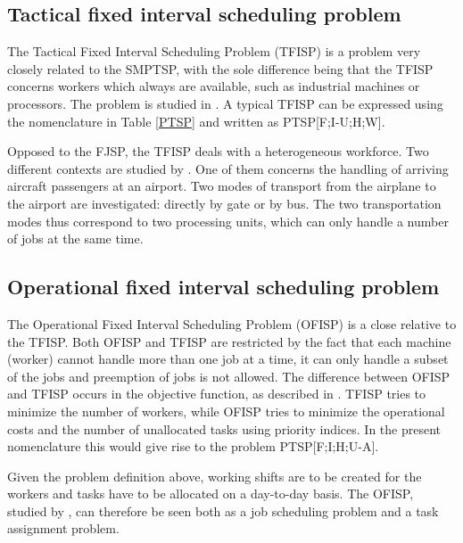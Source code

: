 \subsection{Tactical fixed interval scheduling problem} \label{TFISP}
The Tactical Fixed Interval Scheduling Problem (TFISP) is a problem very closely related to the SMPTSP, with the sole difference being that the TFISP concerns workers which always are available, such as industrial machines or processors. The problem is studied in \citet{kroon_1995}. A typical TFISP can be expressed using the nomenclature in Table \ref{PTSP} and written as PTSP[F;I-U;H;W].

Opposed to the FJSP, the TFISP deals with a heterogeneous workforce. Two different contexts are studied by \citet{kroon_1995}. One of them concerns the handling of arriving aircraft passengers at an airport. Two modes of transport from the airplane to the airport are investigated: directly by gate or by bus. The two transportation modes thus correspond to two processing units, which can only handle a number of jobs at the same time.

\subsection{Operational fixed interval scheduling problem}
The Operational Fixed Interval Scheduling Problem (OFISP) is a close relative to the TFISP. Both OFISP and TFISP are restricted by the fact that each machine (worker) cannot handle more than one job at a time, it can only handle a subset of the jobs and preemption of jobs is not allowed. The difference between OFISP and TFISP occurs in the objective function, as described in \citet{kroon_1995}. TFISP tries to minimize the number of workers, while OFISP tries to minimize the operational costs and the number of unallocated tasks using priority indices. In the present nomenclature this would give rise to the problem PTSP[F;I;H;U-A].

Given the problem definition above, working shifts are to be created for the workers and tasks have to be allocated on a day-to-day basis. The OFISP, studied by \citet{kroon_1995}, can therefore be seen both as a job scheduling problem and a task assignment problem.



%


